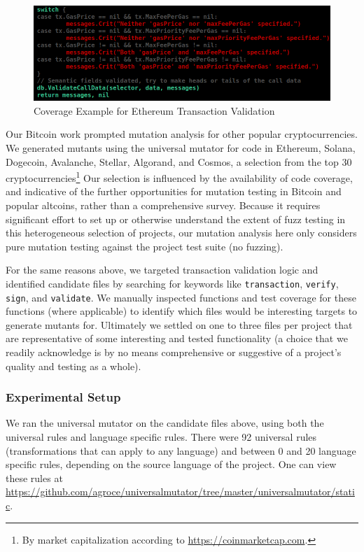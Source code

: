 \begin{figure}
\vspace{2mm}
\includegraphics[width=0.9\columnwidth]{coverage-example.png}
\caption{Coverage Example for Ethereum Transaction Validation}
\label{fig:coverage}
\end{figure}

Our Bitcoin work prompted mutation analysis for other popular cryptocurrencies.
We generated mutants using the universal mutator for code in Ethereum, Solana,
Dogecoin, Avalanche, Stellar, Algorand, and Cosmos, a selection from the top 30
cryptocurrencies\footnote{By market capitalization according to
\url{https://coinmarketcap.com}.} Our selection is influenced by the
availability of code coverage, and indicative of the further opportunities for
mutation testing in Bitcoin and popular altcoins, rather than a
comprehensive survey. Because it requires significant effort to set up or
otherwise understand the extent of fuzz testing in this heterogeneous selection
of projects, our mutation analysis here only considers pure mutation testing
against the project test suite (no fuzzing).

For the same reasons above, we targeted transaction validation logic and
identified candidate files by searching for keywords like \texttt{transaction},
\texttt{verify}, \texttt{sign}, and \texttt{validate}. We manually inspected
functions and test coverage for these functions (where applicable) to identify
which files would be interesting targets to generate mutants for. Ultimately we
settled on one to three files per project that are representative of some
interesting and tested functionality (a choice that we readily acknowledge is by
no means comprehensive or suggestive of a project's quality and testing as a
whole).

\subsubsection*{Experimental Setup}
We ran the universal mutator on the candidate files above, using both the universal rules and
language specific rules. There were 92 universal rules (transformations that can apply to
any language) and between 0 and 20 language specific rules, depending on the source language
of the project. One can view these rules 
at \url{https://github.com/agroce/universalmutator/tree/master/universalmutator/static}.

